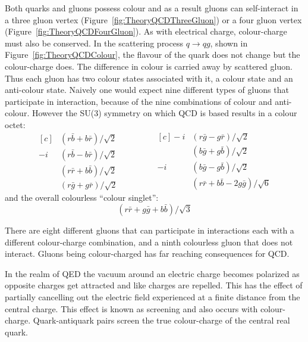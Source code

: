 Both quarks and gluons possess colour and as a result gluons can self-interact in a three gluon vertex (Figure~\ref{fig:TheoryQCDThreeGluon}) or a four gluon vertex (Figure~\ref{fig:TheoryQCDFourGluon}). As with electrical charge, colour-charge must also be conserved. In the scattering process $q\rightarrow qg$, shown in Figure~\ref{fig:TheoryQCDColour}, the flavour of the quark does not change but the colour-charge does. The difference in colour is carried away by scattered gluon. Thus each gluon has two colour states associated with it, a colour state and an anti-colour state. Naively one would expect nine different types of gluons that participate in interaction, because of the nine combinations of colour and anti-colour. However the SU(3) symmetry on which QCD is based results in a colour octet:
%
\begin{equation}
  \begin{aligned}[c]
    &(r\bar{b}+b\bar{r})/\sqrt{2} \\
    -i&(r\bar{b}-b\bar{r})/\sqrt{2} \\
    &(r\bar{r}+b\bar{b})/\sqrt{2} \\
    &(r\bar{g}+g\bar{r})/\sqrt{2}
  \end{aligned}
  \qquad\qquad
  \begin{aligned}[c]
    -i&(r\bar{g}-g\bar{r})/\sqrt{2} \\
    &(b\bar{g}+g\bar{b})/\sqrt{2} \\
    -i&(b\bar{g}-g\bar{b})/\sqrt{2} \\
    &(r\bar{r}+b\bar{b}-2g\bar{g})/\sqrt{6}
  \end{aligned}
\end{equation}
%
and the overall colourless ``colour singlet'':
%
\begin{equation}
  (r\bar{r} + g\bar{g} + b\bar{b})/\sqrt{3}
\end{equation}

There are eight different gluons that can participate in interactions each with a different colour-charge combination, and a ninth colourless gluon that does not interact. Gluons being colour-charged has far reaching consequences for QCD\@.

In the realm of QED the vacuum around an electric charge becomes polarized as opposite charges get attracted and like charges are repelled. This has the effect of partially cancelling out the electric field experienced at a finite distance from the central charge. This effect is known as screening and also occurs with colour-charge. Quark-antiquark pairs screen the true colour-charge of the central real quark.

